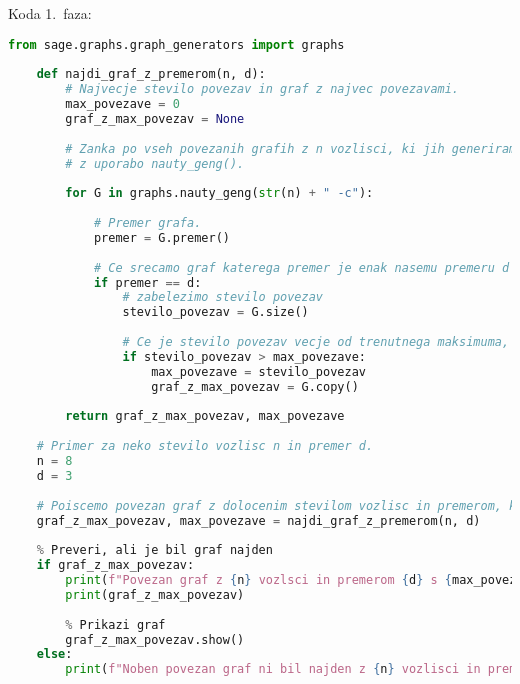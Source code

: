 \documentclass[12pt,a4paper]{amsart}
\makeatletter
\renewcommand\section{\@startsection{section}{1}%
  \z@{.5\linespacing\@plus.7\linespacing}{.5\linespacing}%
  {\normalfont\scshape\large\centering}}
\renewcommand\subsection{\@startsection{subsection}{2}%
  \z@{.5\linespacing\@plus.7\linespacing}{.5\linespacing}%
  {\normalfont\scshape}}
\theoremstyle{definition} %
\theoremstyle{plain} %
\makeatother
\begin{document}
\section{Koda}
\vspace{10pt}
\subsection{1.\ faza:}
\vspace{10pt}

\begin{lstlisting}[language=Python]
    from sage.graphs.graph_generators import graphs
    
    def najdi_graf_z_premerom(n, d):
        # Najvecje stevilo povezav in graf z najvec povezavami.
        max_povezave = 0
        graf_z_max_povezav = None
        
        # Zanka po vseh povezanih grafih z n vozlisci, ki jih generiramo 
        # z uporabo nauty_geng().
        
        for G in graphs.nauty_geng(str(n) + " -c"):
            
            # Premer grafa.
            premer = G.premer()
            
            # Ce srecamo graf katerega premer je enak nasemu premeru d
            if premer == d:
                # zabelezimo stevilo povezav
                stevilo_povezav = G.size()
                
                # Ce je stevilo povezav vecje od trenutnega maksimuma, posodobi maksimum.
                if stevilo_povezav > max_povezave:
                    max_povezave = stevilo_povezav
                    graf_z_max_povezav = G.copy()  
        
        return graf_z_max_povezav, max_povezave
    
    # Primer za neko stevilo vozlisc n in premer d.
    n = 8
    d = 3
    
    # Poiscemo povezan graf z dolocenim stevilom vozlisc in premerom, ki bo imel maksimalno stevilo povezav.
    graf_z_max_povezav, max_povezave = najdi_graf_z_premerom(n, d)
    
    % Preveri, ali je bil graf najden
    if graf_z_max_povezav:
        print(f"Povezan graf z {n} vozlsci in premerom {d} s {max_povezave} povezavami:")
        print(graf_z_max_povezav)
        
        % Prikazi graf
        graf_z_max_povezav.show()
    else:
        print(f"Noben povezan graf ni bil najden z {n} vozlisci in premerom {d}.")
    

\end{lstlisting}
\end{document}
